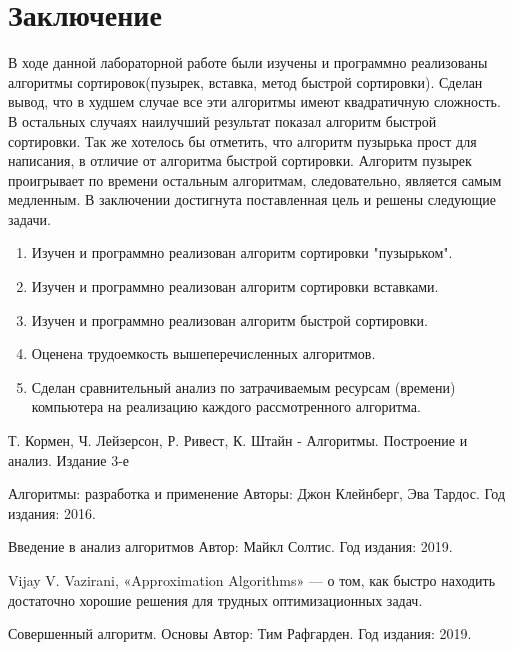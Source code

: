 \documentclass[12pt]{report}
\begin{document}
\chapter*{Заключение}
В ходе данной лабораторной работе были изучены и программно реализованы алгоритмы сортировок(пузырек, вставка, метод быстрой сортировки). Сделан вывод, что в худшем случае все эти алгоритмы имеют квадратичную сложность. В остальных случаях наилучший результат показал алгоритм быстрой сортировки. Так же хотелось бы отметить, что алгоритм пузырька прост для написания, в отличие от алгоритма быстрой сортировки. Алгоритм пузырек проигрывает по времени остальным алгоритмам, следовательно, является самым медленным. \newline
В заключении достигнута поставленная цель и решены следующие задачи.

\begin{enumerate}
\item Изучен и программно реализован алгоритм сортировки "пузырьком".
\item Изучен и программно реализован алгоритм сортировки вставками.
\item Изучен и программно реализован алгоритм быстрой сортировки.
\item Оценена трудоемкость вышеперечисленных алгоритмов.
\item Сделан сравнительный анализ по затрачиваемым ресурсам (времени) компьютера на реализацию каждого рассмотренного алгоритма.
\end{enumerate}

\begin{thebibliography}{9}

 
Т. Кормен, Ч. Лейзерсон, Р. Ривест, К. Штайн - Алгоритмы. Построение и анализ. Издание 3-е
 
	Алгоритмы: разработка и применение
Авторы: Джон Клейнберг, Эва Тардос.
Год издания: 2016.

 
	Введение в анализ алгоритмов
Автор: Майкл Солтис. Год издания: 2019.
	
	Vijay V. Vazirani, «Approximation Algorithms»  — о том, как быстро находить достаточно хорошие решения для трудных оптимизационных задач.
	
	Совершенный алгоритм. Основы
Автор: Тим Рафгарден. Год издания: 2019.
	
\end{thebibliography}
\end{document}
